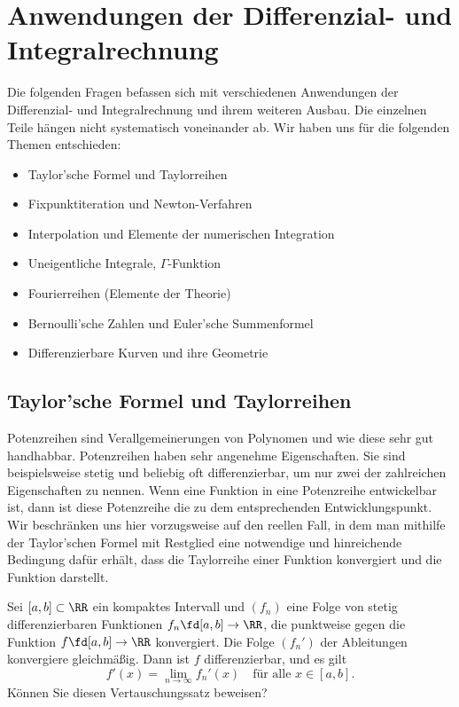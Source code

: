 
\chapter{Anwendungen der Differenzial- und Integralrechnung}

Die folgenden Fragen befassen sich mit verschiedenen Anwendungen der 
Differenzial- und Integralrechnung und ihrem weiteren Ausbau. 
Die einzelnen Teile hängen nicht systematisch voneinander ab. Wir haben uns 
für die folgenden Themen entschieden:
\begin{itemize}[2mm]
\item[\desc{1}] Taylor'sche Formel und Taylorreihen
\item[\desc{2}] Fixpunktiteration und Newton-Verfahren
\item[\desc{3}] Interpolation und Elemente der numerischen Integration
\item[\desc{4}] Uneigentliche Integrale, $\Gamma$-Funktion
\item[\desc{5}] Fourierreihen (Elemente der Theorie)
\item[\desc{6}] Bernoulli'sche Zahlen und Euler'sche Summenformel
\item[\desc{7}] Differenzierbare Kurven und ihre Geometrie
\end{itemize}


\section{Taylor'sche Formel und Taylorreihen}

Potenzreihen sind Verallgemeinerungen von Polynomen und wie diese 
sehr gut handhabbar. Potenzreihen haben sehr angenehme Eigenschaften. Sie sind beispielsweise  
stetig und beliebig oft differenzierbar, um nur zwei der zahlreichen Eigenschaften zu nennen. 
Wenn eine Funktion in eine 
Potenzreihe entwickelbar ist, dann ist diese Potenzreihe die 
 zu dem entsprechenden Entwicklungspunkt. 
Wir beschränken uns hier vorzugsweise auf den reellen Fall, in dem 
man mithilfe der Taylor'schen Formel mit Restglied eine notwendige und 
hinreichende Bedingung dafür erhält, dass die Taylorreihe einer 
Funktion konvergiert und die Funktion darstellt.  

\begin{frage}
  Sei $[a,b]\subset \RR$ ein kompaktes Intervall und 
  $(f_n)$ eine Folge von stetig differenzierbaren 
  Funktionen $f_n \fd [a,b] \to \RR$, die punktweise 
  gegen die Funktion $f\fd [a,b]\to\RR$ konvergiert. 
  Die Folge $(f_n')$ der Ableitungen konvergiere gleichmäßig. 
  Dann ist $f$ differenzierbar, und es gilt
  \[
  f'(x) = \lim_{n\to\infty} f_n'(x) \quad\text{für alle $x\in [a,b]$.}
  \]
  Können Sie diesen Vertauschungssatz beweisen?
\end{frage}

